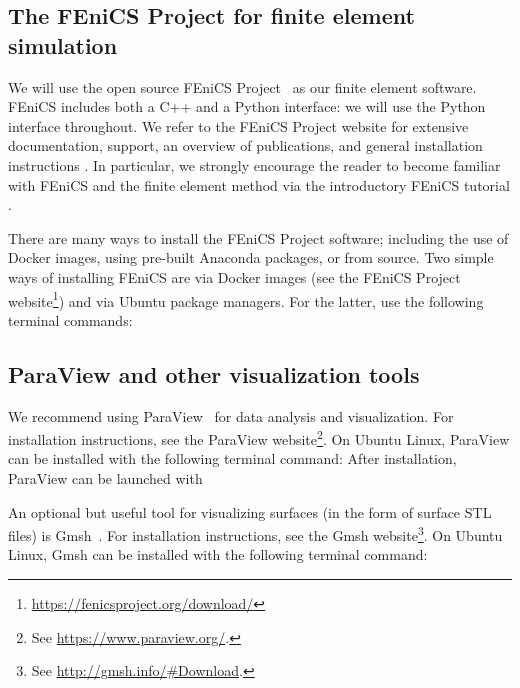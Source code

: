 \subsection{The FEniCS Project for finite element simulation}
\label{sec:chp2:tools:fenics}

We will use the open source FEniCS Project~\cite{alnaes2015fenics,
  logg2012automated} as our finite element software. FEniCS
includes both a C++ and a Python interface: we will use the Python
interface throughout. We refer to the FEniCS Project website for
extensive documentation, support, an overview of publications, and general
installation instructions \cite{fenicsproject}. In particular, we
strongly encourage the reader to become familiar with FEniCS and the finite
element method via the introductory FEniCS tutorial
\cite{langtangen2016solving}.

There are many ways to install the FEniCS Project software; including
the use of Docker images, using pre-built Anaconda packages, or from
source. Two simple ways of installing FEniCS are via Docker
images (see the FEniCS Project
website\footnote{\url{https://fenicsproject.org/download/}}) and via Ubuntu
package managers. For the latter, use the following terminal commands:


\subsection{ParaView and other visualization tools}
\label{sec:chp2:paraview}

We recommend using ParaView~\cite{ahrens2005paraview} for data
analysis and visualization. For installation instructions, see the
ParaView website\footnote{See \url{https://www.paraview.org/}.}. On Ubuntu
Linux, ParaView can be installed with the following
terminal command:
\noindent After installation, ParaView can be launched with

An optional but useful tool for visualizing surfaces (in the form
of surface STL files) is Gmsh~\cite{geuzaine2009gmsh}. For installation
instructions, see the Gmsh
website\footnote{See \url{http://gmsh.info/\#Download}.}. On Ubuntu Linux,
Gmsh can be installed with the following terminal command:

